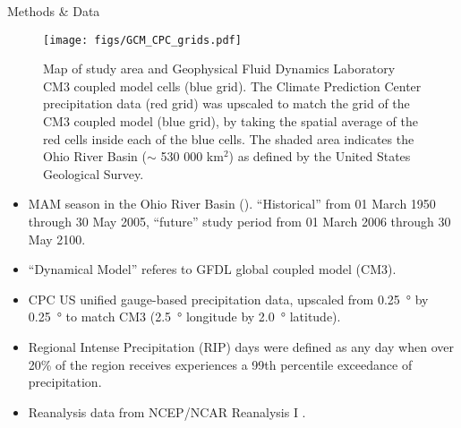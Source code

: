 \begin{block}{Methods \& Data}
  \begin{figure}[ht]
    \centerline{\texttt{[image: figs/GCM\_CPC\_grids.pdf]}}
    \caption{
      Map of study area and Geophysical Fluid Dynamics Laboratory CM3 coupled model cells (blue grid).
      The Climate Prediction Center precipitation data (red grid) was upscaled to match the grid of the CM3 coupled model (blue grid), by taking the spatial average of the red cells inside each of the blue cells.
      The shaded area indicates the Ohio River Basin ($\sim$ 530 000 km$^2$) as defined by the United States Geological Survey.
    }
    \label{fig:area-map}
  \end{figure}
  \begin{itemize}
    \item MAM season in the Ohio River Basin ().
    ``Historical'' from 01 March 1950 through 30 May 2005, ``future'' study period from 01 March 2006 through 30 May 2100.
    \item ``Dynamical Model'' referes to GFDL global coupled model \citep{Donner2011} (CM3).
    \item CPC US unified gauge-based precipitation data, upscaled from \SI{0.25}{\degree} by \SI{0.25}{\degree} to match CM3 (\SI{2.5}{\degree} longitude by \SI{2.0}{\degree} latitude).
    \item Regional Intense Precipitation (RIP) days were defined as any day when over 20\% of the region receives experiences a 99th percentile exceedance of precipitation.
    \item Reanalysis data from NCEP/NCAR Reanalysis I \citep{Kalnay1996}.
  \end{itemize}
\end{block}
